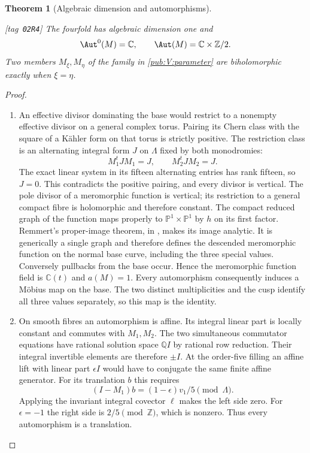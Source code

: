 \documentclass[11pt,a4paper]{article}
\numberwithin{equation}{section}
\newtheorem{theorem}{Theorem}[section]
\theoremstyle{definition}
\newcommand{\StatementRecord}[4]{{\upshape\footnotesize[tag~\texttt{#3}]}\enspace\ignorespaces}
\begin{document}
\begin{theorem}[Algebraic dimension and automorphisms]\hypertarget{tag-02R4}{}\label{night:P1A.4}
\StatementRecord{night:P1A.4}{proved}{02R4}{\cref{night:P1.1}, \cref{night:P1.9}, \cref{night:P1.15}, \cref{night:P1A.1}}
The fourfold has algebraic dimension one and
\[
\Aut^0(M)=\mathbb C,\qquad
\Aut(M)=\mathbb C\times\mathbb Z/2.
\]
Two members $M_\xi,M_\eta$ of the family in
\cref{pub:V:parameter} are biholomorphic exactly when $\xi=\eta$.
\end{theorem}
\begin{proof}
\begin{enumerate}[label=\arabic*.]
\item An effective divisor dominating the base would restrict to
a nonempty effective divisor on a general complex torus.
Pairing its Chern class with the square of a Kähler form
on that torus is strictly positive. The restriction class is an alternating integral form $J$ on $\Lambda$
fixed by both monodromies:
\[
M_1^tJM_1=J,\qquad M_2^tJM_2=J.
\]
The exact linear system in its fifteen alternating entries has rank
fifteen, so $J=0$.  This contradicts the positive pairing, and every
divisor is vertical.
The pole divisor of a meromorphic function is vertical;
its restriction to a general compact fibre is holomorphic
and therefore constant. The compact reduced graph of the function maps properly to
$\mathbb P^1\times\mathbb P^1$ by $h$ on its first factor.
Remmert's proper-image theorem, in
\cite[\S7, Satz~1, p.~60]{Grauert60}, makes its image analytic.
It is generically a single graph and therefore defines the descended
meromorphic function on the normal base curve, including the three
special values.
Conversely pullbacks from the base occur. Hence the
meromorphic function field is $\mathbb C(t)$ and $a(M)=1$.
Every automorphism consequently induces a Möbius map on
the base. The two distinct multiplicities and the cusp
identify all three values separately, so this map is the
identity.

\item On smooth fibres an automorphism is affine. Its integral
linear part is locally constant and commutes with $M_1,M_2$.
The two simultaneous commutator equations have rational solution
space $\mathbb QI$ by rational row reduction. Their integral invertible
elements are therefore $\pm I$. At the order-five filling an affine lift with
linear part $\epsilon I$ would have to conjugate the same
finite affine generator. For its translation $b$ this
requires
\[
(I-M_1)b=(1-\epsilon)v_1/5\pmod\Lambda.
\]
Applying the invariant integral covector $\ell$ makes the
left side zero. For $\epsilon=-1$ the right side is
$2/5\pmod\mathbb Z$, which is nonzero. Thus every
automorphism is a translation.


\end{enumerate}
\end{proof}
\end{document}
